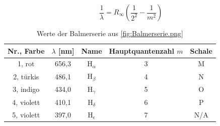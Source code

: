 \vspace{1cm}
\begin{equation}
    \frac{1}{\lambda}=R_{\infty}\left(\frac{1}{2^{2}}-\frac{1}{m^{2}}\right)
    \label{Rydberg}
\end{equation}

\begin{table}[htbp]
\centering
\begin{tabular}{|c|c|c|c|c|}
\hline
\rule{0pt}{2.5ex} Nr., Farbe & \(\lambda\) [nm] & Name & Hauptquantenzahl \(m\) & Schale \\ [0.5ex]
\hline
1, rot         &  656,3     &  \(\mathrm{H}_\alpha\)  &  3 & M\\
2, türkis      &  486,1     &  \(\mathrm{H}_\beta\)    &  4 & N\\
3, indigo      &  434,0     &  \(\mathrm{H}_\gamma\)    &  5 & O\\
4, violett     &  410,1     &  \(\mathrm{H}_\delta\)     &  6 & P\\
5, violett     &  397,0     &  \(\mathrm{H}_\epsilon\)    &  7 & N/A\\
\hline
\end{tabular}
\caption{Werte der Balmerserie aus \cref{fig:Balmerserie.png}}
\label{table:Balmer}
\end{table}

